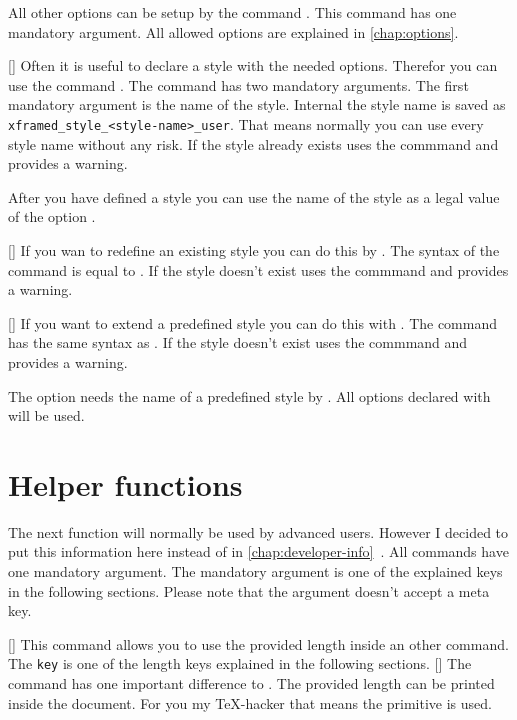 \documentclass[openany,12pt,tocdepth=3]{ltx-md}
\begin{document}
All other options can be setup by the command .
This command has one mandatory argument. All allowed options are explained
in \autoref{chap:options}. 

[\MArgs]
Often it is useful to declare a style with the needed options. Therefor
you can use the command . The command
has two mandatory arguments. The first mandatory argument
is the name of the style. Internal the style name is saved
as \verb+xframed_style_<style-name>_user+. That means normally
you can use every style name without any risk. If the style already exists
 uses the commmand  and
provides a warning.

After you have defined a style you can use the name of the style as
a legal value of the option .

[\MArgs]
If you wan to redefine an existing style you can do this by 
. The syntax of the command
is equal to . If the style doesn't exist
 uses the commmand  and
provides a warning.

[\MArgs]
If you want to extend a predefined style you can do this
with . The command has the same
syntax as . If the style doesn't exist
 uses the commmand  and
provides a warning.

The option  needs the name of a predefined style
by  . All options declared with  
will be used.


\section{Helper functions}\label{sec:helperfunctions}
The next function will normally be used by advanced users. However
I decided to put this information here instead of in
\autoref{chap:developer-info}~.
All commands have one mandatory argument. The mandatory argument
is one of the explained keys in the following sections. Please note 
that the argument doesn't accept a meta key.

[\MArgs[key]]
This command  allows you to use the
provided length inside an other command. The \texttt{key} is one of
the length keys explained in the following sections. 
[\MArgs[key]]
The command  has one important
difference to . The provided length
can be printed inside the document. For you my \TeX-hacker
that means the primitive  is used. 
\end{document}
